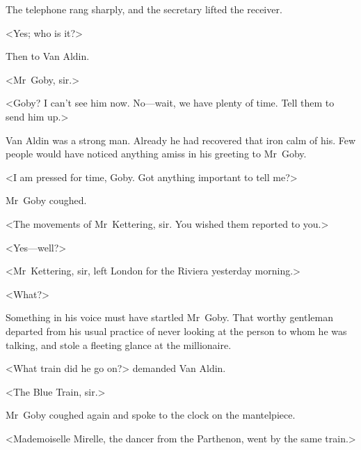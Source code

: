 The telephone rang sharply, and the secretary lifted the receiver.

<Yes; who is it?>

Then to Van Aldin.

<Mr~Goby, sir.>

<Goby? I can't see him now. No—wait, we have plenty of time. Tell them to send him up.>

Van Aldin was a strong man. Already he had recovered that iron calm of his. Few people would have noticed anything amiss in his greeting to Mr~Goby.

<I am pressed for time, Goby. Got anything important to tell me?>

Mr~Goby coughed.

<The movements of Mr~Kettering, sir. You wished them reported to you.>

<Yes—well?>

<Mr~Kettering, sir, left London for the Riviera yesterday morning.>

<What?>

Something in his voice must have startled Mr~Goby. That worthy gentleman departed from his usual practice of never looking at the person to whom he was talking, and stole a fleeting glance at the millionaire.

<What train did he go on?> demanded Van Aldin.

<The Blue Train, sir.>

Mr~Goby coughed again and spoke to the clock on the mantelpiece.

<Mademoiselle Mirelle, the dancer from the Parthenon, went by the same train.>